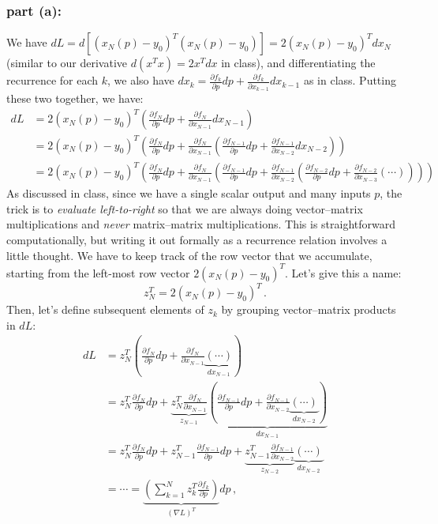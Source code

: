 \documentclass[10pt,oneside]{article}
\begin{document}
\subsubsection*{part (a):}

We have $dL = d[ (x_N(p) - y_0)^T (x_N(p) - y_0)] = 2 (x_N(p) - y_0)^T dx_N $ (similar to our derivative $d(x^T x)=2x^T dx$ in class), and differentiating the recurrence for each $k$, we also have $dx_k = \frac{\partial f_k}{\partial p} dp + \frac{\partial f_k}{\partial x_{k-1}} dx_{k-1}$ as in class.   Putting these two together, we have:
\begin{align*}
dL &= 2 (x_N(p) - y_0)^T \left( \frac{\partial f_N}{\partial p} dp + \frac{\partial f_N}{\partial x_{N-1}} dx_{N-1}
\right) \\
&= 2 (x_N(p) - y_0)^T \left( \frac{\partial f_N}{\partial p} dp + \frac{\partial f_N}{\partial x_{N-1}} \left( \frac{\partial f_{N-1}}{\partial p} dp + \frac{\partial f_{N-1}}{\partial x_{N-2}} dx_{N-2}
\right) \right) \\
&= 2 (x_N(p) - y_0)^T \left( \frac{\partial f_N}{\partial p} dp + \frac{\partial f_N}{\partial x_{N-1}} \left( \frac{\partial f_{N-1}}{\partial p} dp + \frac{\partial f_{N-1}}{\partial x_{N-2}} \left( \frac{\partial f_{N-2}}{\partial p} dp + \frac{\partial f_{N-2}}{\partial x_{N-3}} 
\left( \cdots \right)
\right)
\right) \right)
\end{align*}
As discussed in class, since we have a single scalar output and many inputs $p$, the trick is to \emph{evaluate left-to-right} so that we are always doing vector--matrix multiplications and \emph{never} matrix--matrix multiplications.  This is straightforward computationally, but writing it out formally as a recurrence relation involves a little thought.
We have to keep track of the row vector that we accumulate, starting from the left-most row vector $2 (x_N(p) - y_0)^T$. Let's give this a name:
$$
\boxed{z_N^T =  2 (x_N(p) - y_0)^T} \, .
$$
Then, let's define subsequent elements
of $z_k$ by grouping vector--matrix products in $dL$:
\begin{align*}
dL &= z_N^T \left( \frac{\partial f_N}{\partial p} dp + \frac{\partial f_N}{\partial x_{N-1}} \underbrace{(\cdots)}_{dx_{N-1}}
\right) \\
& = z_N^T \frac{\partial f_N}{\partial p} dp + \underbrace{z_N^T \frac{\partial f_N}{\partial x_{N-1}}}_{z_{N-1}} \underbrace{\left( \frac{\partial f_{N-1}}{\partial p} dp + \frac{\partial f_{N-1}}{\partial x_{N-2}} \underbrace{(\cdots)}_{dx_{N-2}} \right)}_{dx_{N-1}}
\\
& = z_N^T \frac{\partial f_N}{\partial p} dp +
z_{N-1}^T \frac{\partial f_{N-1}}{\partial p} dp
+ 
\underbrace{z_{N-1}^T \frac{\partial f_{N-1}}{\partial x_{N-2}}}_{z_{N-2}} \underbrace{(\cdots)}_{dx_{N-2}}
\\
&= \cdots = \underbrace{\left(\sum_{k=1}^N z_k^T \frac{\partial f_k}{\partial p} \right)}_{(\nabla L)^T} dp \, ,
\end{align*}
\end{document}
